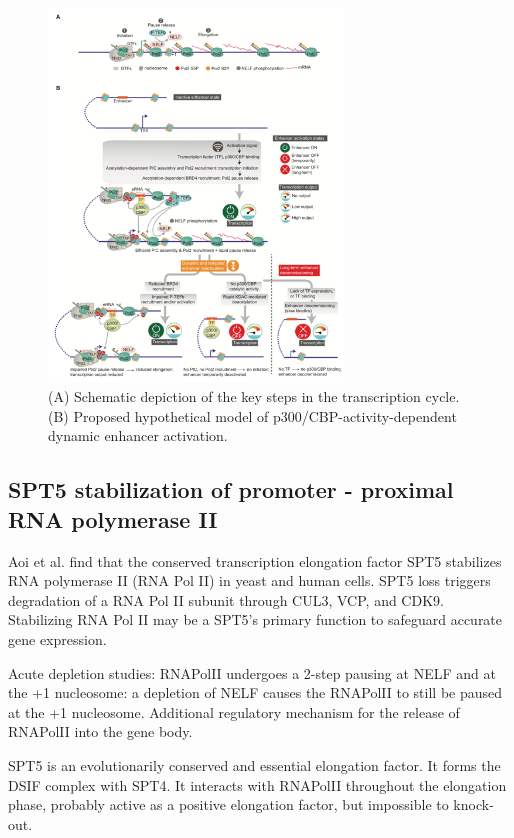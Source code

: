 \begin{figure}
\centering
\includegraphics[width=0.7\textwidth]{../_resources/Screenshot_2022-12-19_at_16-39-14.png}
\caption{(A) Schematic depiction of the key steps in the transcription cycle.
(B) Proposed hypothetical model of p300/CBP-activity-dependent dynamic enhancer activation. }
\end{figure}

\subsection{SPT5 stabilization of promoter - proximal RNA polymerase II}
Aoi et al. find that the conserved transcription elongation factor SPT5 stabilizes RNA polymerase II (RNA Pol II) in yeast and human
cells. SPT5 loss triggers degradation of a RNA Pol II subunit through CUL3, VCP, and CDK9. Stabilizing RNA Pol II may be a SPT5’s primary function to safeguard accurate gene expression.

Acute depletion studies: RNAPolII undergoes a 2-step pausing at NELF and at the +1 nucleosome: a depletion of NELF causes the RNAPolII to still be paused at the +1 nucleosome. Additional regulatory mechanism for the release of RNAPolII into the gene body.

SPT5 is an evolutionarily conserved and essential elongation factor. It forms the DSIF complex with SPT4. It interacts with RNAPolII throughout the elongation phase, probably active as a positive elongation factor, but impossible to knock-out.

